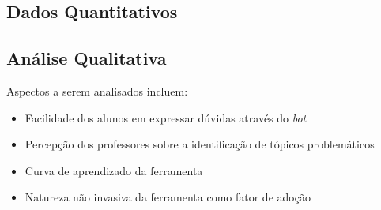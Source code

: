 \subsection{Dados Quantitativos}
\label{subsec:dados-quant}

\subsection{Análise Qualitativa}
\label{subsec:analise-qual}

Aspectos a serem analisados incluem:

\begin{itemize}
\item Facilidade dos alunos em expressar dúvidas através do \textit{bot} 
\item Percepção dos professores sobre a identificação de tópicos problemáticos
\item Curva de aprendizado da ferramenta
\item Natureza não invasiva da ferramenta como fator de adoção
\end{itemize}
